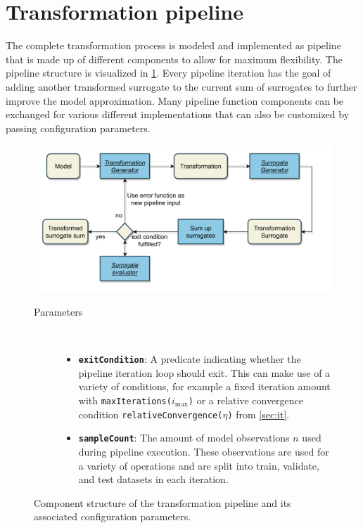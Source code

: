 \documentclass[
  a4paper,  %
  twoside,  %
  bibliography=totoc,
  headsepline,
  cleardoublepage=empty,
  parskip=half,
  draft=false
]{scrbook}
\begin{document}
\newpage
\section{Transformation pipeline}
\label{sec:tp}

The complete transformation process is modeled and implemented as pipeline that is made up of different components to allow for maximum flexibility.
The pipeline structure is visualized in \cref{fig:tp}.
Every pipeline iteration has the goal of adding another transformed surrogate to the current sum of surrogates to further improve the model approximation.
Many pipeline function components can be exchanged for various different implementations that can also be customized by passing configuration parameters.

\begin{mdframed}[style=style,frametitle={Transformation Pipeline}]
\begin{figure}[H]

\includegraphics[width=\textwidth]{graphics/TransformationPipeline.pdf}
\vspace{-7.5mm}

\delimit
\vspace{1.5mm}

\begin{description}
\item[Parameters] {~ \begin{itemize}[\indent{}]
\item \texttt{\textbf{exitCondition}}: A predicate indicating whether the pipeline iteration loop should exit. This can make use of a variety of conditions, for example a fixed iteration amount with \texttt{maxIterations($i_{\mathrm{max}}$)} or a relative convergence condition \texttt{relativeConvergence($\eta$)} from \cref{sec:it}.
\item \texttt{\textbf{sampleCount}}: The amount of model observations $n$ used during pipeline execution. These observations are used for a variety of operations and are split into train, validate, and test datasets in each iteration.
\end{itemize}}
\end{description}

\delimit

\caption{Component structure of the transformation pipeline and its associated configuration parameters.}
\label{fig:tp}
\end{figure}
\end{mdframed}
\end{document}
